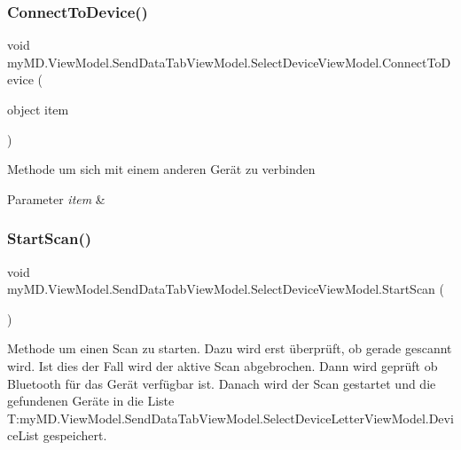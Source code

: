 \subsubsection{\texorpdfstring{Connect\+To\+Device()}{ConnectToDevice()}}
{\footnotesize\ttfamily void my\+M\+D.\+View\+Model.\+Send\+Data\+Tab\+View\+Model.\+Select\+Device\+View\+Model.\+Connect\+To\+Device (\begin{DoxyParamCaption}\item[{object}]{item }\end{DoxyParamCaption})}



Methode um sich mit einem anderen Gerät zu verbinden 


\begin{DoxyParams}{Parameter}
{\em item} & \\
\hline
\end{DoxyParams}
\mbox{\label{classmy_m_d_1_1_view_model_1_1_send_data_tab_view_model_1_1_select_device_view_model_aa20931acf9e9c3580019a5025d2f1abb}} 
\subsubsection{\texorpdfstring{Start\+Scan()}{StartScan()}}
{\footnotesize\ttfamily void my\+M\+D.\+View\+Model.\+Send\+Data\+Tab\+View\+Model.\+Select\+Device\+View\+Model.\+Start\+Scan (\begin{DoxyParamCaption}{ }\end{DoxyParamCaption})}



Methode um einen Scan zu starten. Dazu wird erst überprüft, ob gerade gescannt wird. Ist dies der Fall wird der aktive Scan abgebrochen. Dann wird geprüft ob Bluetooth für das Gerät verfügbar ist. Danach wird der Scan gestartet und die gefundenen Geräte in die Liste T\+:my\+M\+D.\+View\+Model.\+Send\+Data\+Tab\+View\+Model.\+Select\+Device\+Letter\+View\+Model.\+Device\+List gespeichert. 

